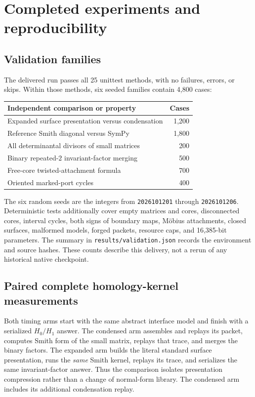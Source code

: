\documentclass[11pt]{article}
\theoremstyle{definition}
\theoremstyle{remark}
\newcommand{\code}[1]{\texttt{#1}}
\begin{document}
\section{Completed experiments and reproducibility}
\label{sec:experiments}

\subsection{Validation families}
The delivered run passes all 25 unittest methods, with no failures, errors,
or skips. Within those methods, six seeded families contain 4,800 cases:
\begin{center}
\begin{tabular}{@{}lr@{}}
\toprule
Independent comparison or property & Cases\\
\midrule
Expanded surface presentation versus condensation & 1,200\\
Reference Smith diagonal versus SymPy & 1,800\\
All determinantal divisors of small matrices & 200\\
Binary repeated-$2$ invariant-factor merging & 500\\
Free-core twisted-attachment formula & 700\\
Oriented marked-port cycles & 400\\
\bottomrule
\end{tabular}
\end{center}
The six random seeds are the integers from \code{2026101201} through
\code{2026101206}. Deterministic tests additionally cover empty matrices and
cores, disconnected cores, interval cycles, both signs of boundary maps,
M\"obius attachments, closed surfaces, malformed models, forged packets,
resource caps, and 16,385-bit parameters. The summary in
\code{results/validation.json} records the environment and source hashes.
These counts describe this delivery, not a rerun of any historical native
checkpoint.

\subsection{Paired complete homology-kernel measurements}
Both timing arms start with the same abstract interface model and finish
with a serialized $H_0/H_1$ answer. The condensed arm assembles and replays
its packet, computes Smith form of the small matrix, replays that trace, and
merges the binary factors. The expanded arm builds the literal standard
surface presentation, runs the \emph{same} Smith kernel, replays its trace,
and serializes the same invariant-factor answer. Thus the comparison
isolates presentation compression rather than a change of normal-form
library. The condensed arm includes its additional condensation replay.
\end{document}
